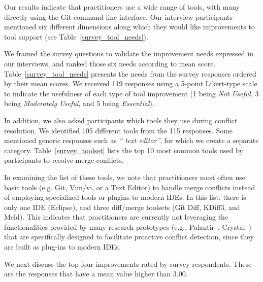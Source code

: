 Our results indicate that practitioners use a wide range of tools, with many directly using the Git command line interface. Our interview participants mentioned six different dimensions along which they would like improvements to tool support (see Table~\ref{survey_tool_needs}). 

We framed the survey questions to validate the improvement needs expressed in our interviews, and ranked those six needs according to mean score.
Table~\ref{survey_tool_needs} presents the needs from the survey responses ordered by their mean scores.
We received 119 responses using a 5-point Likert-type scale to indicate the usefulness of each type of tool improvement (1 being \textit{Not Useful}, 3 being \textit{Moderately Useful}, and 5 being \textit{Essential}).

In addition, we also asked participants which tools they use during conflict resolution.
We identified 105 different tools from the 115 responses. Some mentioned generic responses such as \textit{`` text editor''}, for which we create a separate category.
Table~\ref{survey_toolset} lists the top 10 most common tools used by participants to resolve merge conflicts.

In examining the list of these tools, we note that practitioners most often use basic tools (e.g. Git, Vim/vi, or a Text Editor) to handle merge conflicts instead of employing specialized tools or plugins to modern IDEs. 
In this list, there is only one IDE (Eclipse), and three diff/merge toolsets (Git Diff, KDiff3, and Meld). 
This indicates that practitioners are currently not leveraging the functionalities provided by many research prototypes (e.g., Palantir~\cite{palantir}, Crystal~\cite{Brun2011}) that are specifically designed to facilitate proactive conflict detection, since they are built as plug-ins to modern IDEs. 

We next discuss the top four improvements rated by survey respondents. These are the responses that have a mean value higher than $3.00$.

